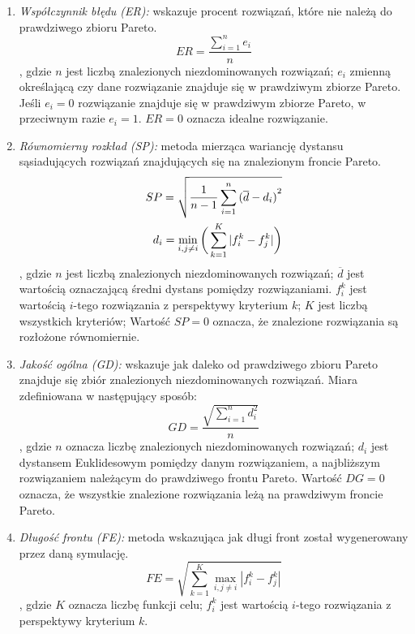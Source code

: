 \documentclass[twoside]{iisthesis}
\begin{document}
\begin{enumerate}
	\item \textit{Współczynnik błędu (ER):} wskazuje procent rozwiązań, które nie należą do prawdziwego zbioru Pareto.
	\begin{equation}
		ER = \dfrac{\sum_{i=1}^{n} e_{i}}{n}
	\end{equation}
	, gdzie $n$ jest liczbą znalezionych niezdominowanych rozwiązań; $e_{i}$ zmienną określającą czy dane rozwiązanie znajduje się w prawdziwym zbiorze Pareto. Jeśli $e_{i} = 0$ rozwiązanie znajduje się w prawdziwym zbiorze Pareto, w przeciwnym razie $e_{i} = 1$. $ER = 0$ oznacza idealne rozwiązanie.\\
	\item \textit{Równomierny rozkład (SP):} metoda mierząca wariancję dystansu sąsiadujących rozwiązań znajdujących się na znalezionym froncie Pareto.
	\begin{equation}
		\begin{split}
		SP = \sqrt{\dfrac{1}{n-1}\sum_{i=1}^{n}{(\overline{d} - d_{i})}^{2}}\\
		d_{i} = \min_{i,j \neq i} \bigg{(} \sum_{k=1}^{K}|f_{i}^{k} - f_{j}^{k}|\bigg{)}
		\end{split}
	\end{equation}
	, gdzie $n$ jest liczbą znalezionych niezdominowanych rozwiązań; $\overline{d}$ jest wartością oznaczającą średni dystans pomiędzy rozwiązaniami. $f_{i}^{k}$ jest wartością $i$-tego rozwiązania z perspektywy kryterium $k$; $K$ jest liczbą wszystkich kryteriów; Wartość $SP = 0$ oznacza, że znalezione rozwiązania są rozłożone równomiernie.\\
	\item \textit{Jakość ogólna (GD):}  wskazuje jak daleko od prawdziwego zbioru Pareto znajduje się zbiór znalezionych niezdominowanych rozwiązań. Miara zdefiniowana w następujący sposób:
	\begin{equation}
		GD = \dfrac{\sqrt{\sum_{i=1}^{n} d_{i}^{2}}}{n}
	\end{equation}
	, gdzie $n$ oznacza liczbę znalezionych niezdominowanych rozwiązań; $d_{i}$ jest dystansem Euklidesowym pomiędzy danym rozwiązaniem, a najbliższym rozwiązaniem należącym do prawdziwego frontu Pareto. Wartość $DG = 0$ oznacza, że wszystkie znalezione rozwiązania leżą na prawdziwym froncie Pareto.\\
	\item \textit{Długość frontu (FE):} metoda wskazująca jak długi front został wygenerowany przez daną symulację.
	\begin{equation}	
		FE = \sqrt{\sum_{k=1}^{K} \max_{i, j \neq i} |f_{i}^{k} - f_{j}^{k}|}
	\end{equation}
	, gdzie $K$ oznacza liczbę funkcji celu; $f_{i}^{k}$ jest wartością $i$-tego rozwiązania z perspektywy kryterium $k$.\\
\end{enumerate}
\end{document}
